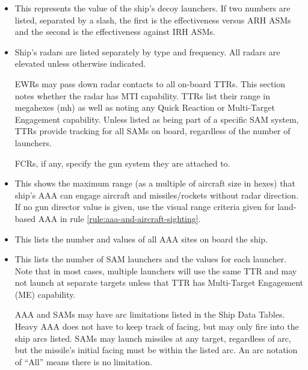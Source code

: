 \begin{itemize}
    \item {} This represents the value of the ship's decoy launchers.  If two numbers are listed, separated by a slash, the first is the effectiveness versus ARH ASMs and the second is the effectiveness against IRH ASMs.

    \item {} Ship's radars are listed separately by type and frequency. All radars are elevated unless otherwise indicated.

    EWRs may pass down radar contacts to all on-board TTRs.  This section notes whether the radar has MTI capability. TTRs list their range in megahexes (mh) as well as noting any Quick Reaction or Multi-Target Engagement capability.  Unless listed as being part of a specific SAM system, TTRs provide tracking for all SAMs on board, regardless of the number of launchers.

    FCRs, if any, specify the gun system they are attached to.

    \item {} This shows the maximum range (as a multiple of aircraft size in hexes) that ship's AAA can engage aircraft and missiles/rockets without radar direction.  If no gun director value is given, use the visual range criteria given for land-based AAA in rule \ref{rule:aaa-and-aircraft-sighting}.

    \item {} This lists the number and values of all AAA sites on board the ship. 

    \item {} This lists the number of SAM launchers and the values for each launcher.  Note that in most cases, multiple launchers will use the same TTR and may not launch at separate targets unless that TTR has Multi-Target Engagement (ME) capability.

    AAA and SAMs may have arc limitations listed in the Ship Data Tables. Heavy AAA does not have to keep track of facing, but may only fire into the ship arcs listed.  SAMs may launch missiles at any target, regardless of arc, but the missile's initial facing must be within the listed arc.  An arc notation of “All” means there is no limitation.
\end{itemize}

